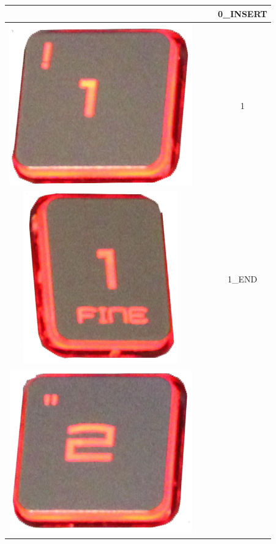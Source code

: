 \begin{longtable}{cccc}
\begin{minipage}[c]{.3\textwidth}
\vspace{0.2cm}
\end{minipage} & & & 0\_INSERT\\
\hline
\begin{minipage}[c]{.3\textwidth}
\vspace{0.2cm}
\includegraphics[scale=0.1]{Images/KeyMapping/1}
\vspace{0.2cm}
\end{minipage} & & & 1\\
\hline
\begin{minipage}[c]{.3\textwidth}
\vspace{0.2cm}
\includegraphics[scale=0.1]{Images/KeyMapping/1_END}
\vspace{0.2cm}
\end{minipage} & & & 1\_END\\
\hline
\begin{minipage}[c]{.3\textwidth}
\vspace{0.2cm}
\includegraphics[scale=0.1]{Images/KeyMapping/2}

\end{minipage}
\end{longtable}
